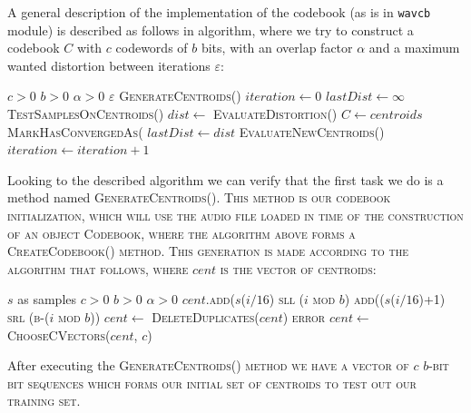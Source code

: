 \documentclass[conference]{IEEEtran}
\begin{document}
A general description of the implementation of the codebook (as is in \texttt{wavcb} module) is described as follows in algorithm, where we try to construct a codebook $C$ with $c$ codewords of $b$ bits, with an overlap factor $\alpha$ and a maximum wanted distortion between iterations $\varepsilon$:

\begin{algorithmic}[1]
	\REQUIRE $c > 0$ \AND $b > 0$ \AND $\alpha > 0$ \AND $\varepsilon$
	\STATE \scshape{GenerateCentroids()}
	\STATE $iteration \leftarrow 0$ 
	\STATE $lastDist \leftarrow \infty$ 
		\STATE \scshape{TestSamplesOnCentroids()}\upshape
		\STATE $dist \leftarrow$ \scshape{EvaluateDistortion()}\upshape
			\STATE $C \leftarrow centroids$
			\STATE \scshape{MarkHasConvergedAs(}\upshape\TRUE{\scshape{)}\upshape}
		\ENDIF
		\STATE $lastDist \leftarrow dist$
		\STATE \scshape{EvaluateNewCentroids()}\upshape
		\STATE $iteration \leftarrow iteration + 1$
	\ENDWHILE
\end{algorithmic}

Looking to the described algorithm we can verify that the first task we do is a method named \scshape{GenerateCentroids()}\upshape. This method is our codebook initialization, which will use the audio file loaded in time of the construction of an object \scshape{Codebook}\upshape, where the algorithm above forms a \scshape{CreateCodebook()} \upshape method. This generation is made according to the algorithm that follows, where $cent$ is the vector of centroids:

\begin{algorithmic}[1]
	\REQUIRE $s$ as samples \AND $c > 0$ \AND $b > 0$ \AND $\alpha > 0$
		\STATE $cent$.\scshape add($s$($i/16$) \upshape sll ($i$ mod $b$) \OR \scshape add(($s$($i/16$)+1) \upshape srl (b-($i$ mod $b$))
		\STATE $cent \leftarrow$ \scshape DeleteDuplicates($cent$) \upshape 
			\RETURN error
		\ENDIF
		\STATE $cent \leftarrow$ \scshape ChooseCVectors($cent$, $c$) \upshape
	\ENDFOR
\end{algorithmic}

After executing the \scshape GenerateCentroids() \upshape method we have a vector of $c$ $b$-bit bit sequences which forms our initial set of centroids to test out our training set. 
\end{document}
